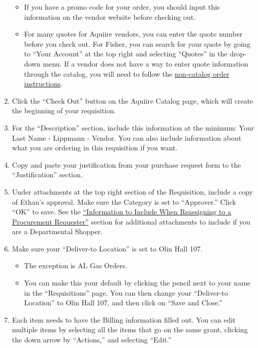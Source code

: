 \documentclass[
]{book}
\begin{document}
\begin{enumerate}
  \begin{itemize}
  \item
    If you have a promo code for your order, you should input this information on the vendor website before checking out.
  \item
    For many quotes for Aquiire vendors, you can enter the quote number before you check out. For Fisher, you can search for your quote by going to ``Your Account'' at the top right and selecting ``Quotes'' in the drop-down menu. If a vendor does not have a way to enter quote information through the catalog, you will need to follow the \protect\hyperlink{noncatalog}{non-catalog order instructions}.
  \end{itemize}
\item
  Click the ``Check Out'' button on the Aquiire Catalog page, which will create the beginning of your requisition.
\item
  For the ``Description'' section, include this information at the minimum: Your Last Name - Lippmann - Vendor. You can also include information about what you are ordering in this requisition if you want.
\item
  Copy and paste your justification from your purchase request form to the ``Justification'' section.
\item
  Under attachments at the top right section of the Requisition, include a copy of Ethan's approval. Make sure the Category is set to ``Approver.'' Click ``OK'' to save. See the \protect\hyperlink{reassign}{``Information to Include When Reassigning to a Procurement Requester''} section for additional attachments to include if you are a Departmental Shopper.
\item
  Make sure your ``Deliver-to Location'' is set to Olin Hall 107.

  \begin{itemize}
  \item
    The exception is AL Gas Orders.
  \item
    You can make this your default by clicking the pencil next to your name in the ``Requisitions'' page. You can then change your ``Deliver-to Location'' to Olin Hall 107, and then click on ``Save and Close.''
  \end{itemize}
\item
  Each item needs to have the Billing information filled out. You can edit multiple items by selecting all the items that go on the same grant, clicking the down arrow by ``Actions,'' and selecting ``Edit.''


\end{enumerate}
\end{document}
